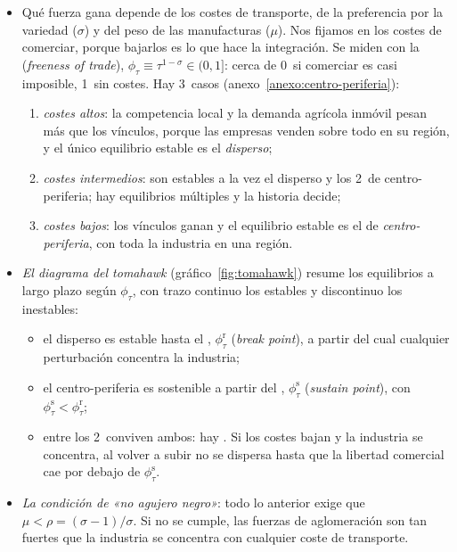 \documentclass[11pt]{article}
\begin{document}
\begin{itemize}
\item Qué fuerza gana depende de los costes de transporte, de la preferencia por la variedad ($\sigma$) y del peso de las manufacturas ($\mu$). Nos fijamos en los costes de comerciar, porque bajarlos es lo que hace la integración. Se miden con la  (\emph{freeness of trade}), $\phi_\tau\equiv\tau^{1-\sigma}\in(0,1]$: cerca de 0~si comerciar es casi imposible, 1~sin costes. Hay 3~casos (anexo~\ref{anexo:centro-periferia}):
  \begin{enumerate}
  \item \emph{costes altos}: la competencia local y la demanda agrícola inmóvil pesan más que los vínculos, porque las empresas venden sobre todo en su región, y el único equilibrio estable es el \emph{disperso};
  \item \emph{costes intermedios}: son estables a la vez el disperso y los 2~de centro-periferia; hay equilibrios múltiples y la historia decide;
  \item \emph{costes bajos}: los vínculos ganan y el equilibrio estable es el de \emph{centro-periferia}, con toda la industria en una región.
  \end{enumerate}
\item \emph{El diagrama del \emph{tomahawk}} (gráfico~\ref{fig:tomahawk}) resume los equilibrios a largo plazo según $\phi_\tau$, con trazo continuo los estables y discontinuo los inestables:
  \begin{itemize}
  \item el disperso es estable hasta el , $\phi_\tau^{\mathrm r}$ (\emph{break point}), a partir del cual cualquier perturbación concentra la industria;
  \item el centro-periferia es sostenible a partir del , $\phi_\tau^{\mathrm s}$ (\emph{sustain point}), con $\phi_\tau^{\mathrm s}<\phi_\tau^{\mathrm r}$;
  \item entre los 2~conviven ambos: hay . Si los costes bajan y la industria se concentra, al volver a subir no se dispersa hasta que la libertad comercial cae por debajo de $\phi_\tau^{\mathrm s}$.
  \end{itemize}
\item \emph{La condición de «no agujero negro»}: todo lo anterior exige que $\mu<\rho=(\sigma-1)/\sigma$. Si no se cumple, las fuerzas de aglomeración son tan fuertes que la industria se concentra con cualquier coste de transporte\nocite{FujitaKrugmanVenables1999Spatial}.

\end{itemize}
\end{document}
